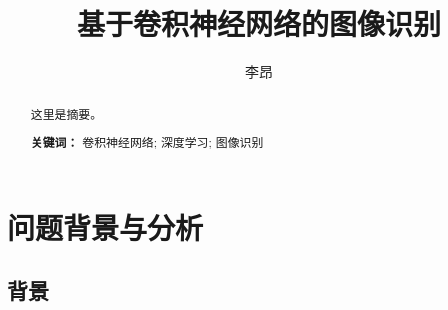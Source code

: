 \documentclass[UTF8]{ctexart}
\author{李昂}
\title{基于卷积神经网络的图像识别}
\begin{document}
\maketitle
\begin{abstract}
这里是摘要。
\begin{flushleft}
\textbf{关键词：} 卷积神经网络; 深度学习; 图像识别
\end{flushleft}
\end{abstract}

\clearpage

\section{问题背景与分析}
\subsection{背景}
\end{document}
